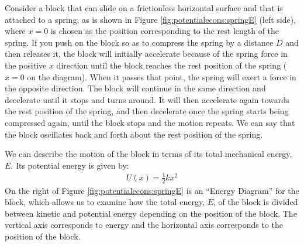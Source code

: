 Consider a block that can slide on a frictionless horizontal surface and that is attached to a spring, as is shown in Figure \ref{fig:potentialecons:springE} (left side), where $x=0$ is chosen as the position corresponding to the rest length of the spring. If you push on the block so as to compress the spring by a distance $D$ and then releases it, the block will initially accelerate because of the spring force in the positive $x$ direction until the block reaches the rest position of the spring ($x=0$ on the diagram). When it passes that point, the spring will exert a force in the opposite direction. The block will continue in the same direction and decelerate until it stops and turns around. It will then accelerate again towards the rest position of the spring, and then decelerate once the spring starts being compressed again, until the block stops and the motion repeats. We can say that the block oscillates back and forth about the rest position of the spring.

We can describe the motion of the block in terms of its total mechanical energy, $E$. Its potential energy is given by:
\begin{align*}
U(x)=\frac{1}{2}kx^2
\end{align*}
On the right of Figure \ref{fig:potentialecons:springE} is an ``Energy Diagram'' for the block, which allows us to examine how the total energy, $E$, of the block is divided between kinetic and potential energy depending on the position of the block. The vertical axis corresponds to energy and the horizontal axis corresponds to the position of the block. 

